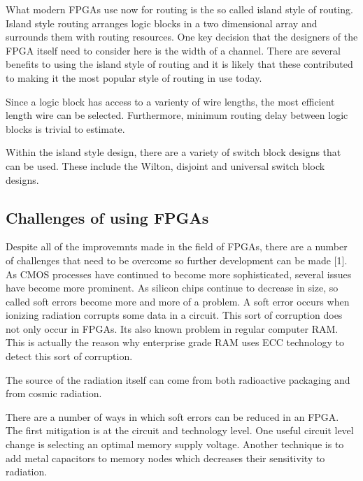 \documentclass{article}
\begin{document}
    What modern FPGAs use now for routing is the so called island style of routing.
    Island style routing arranges logic blocks in a two dimensional array and surrounds
    them with routing resources. One key decision that the designers of the FPGA itself
    need to consider here is the width of a channel.
    There are several benefits to using the island style of routing and it is likely
    that these contributed to making it the most popular style of routing in use today.

    Since a logic block has access to a varienty of wire lengths, the most efficient length
    wire can be selected. Furthermore, minimum routing delay between logic blocks is trivial
    to estimate.

    Within the island style design, there are a variety of switch block designs that
    can be used. These include the Wilton, disjoint and universal switch block designs.
    
    \subsection{Challenges of using FPGAs}

    Despite all of the improvemnts made in the field of FPGAs, there are a number of challenges
    that need to be overcome so further development can be made [1]. As CMOS processes
    have continued to become more sophisticated, several issues have become more prominent.
    As silicon chips continue to decrease in size, so called soft errors become more and more
    of a problem. A soft error occurs when ionizing radiation corrupts some data in a circuit.
    This sort of corruption does not only occur in FPGAs. Its also known problem in
    regular computer RAM. This is actually the reason why enterprise grade RAM uses
    ECC technology to detect this sort of corruption.

    The source of the radiation itself can come from both radioactive packaging and
    from cosmic radiation.

    There are a number of ways in which soft errors can be reduced in an FPGA.
    The first mitigation is at the circuit and technology level.
    One useful circuit level change is selecting an optimal memory supply voltage.
    Another technique is to add metal capacitors to memory nodes which
    decreases their sensitivity to radiation.
\end{document}
